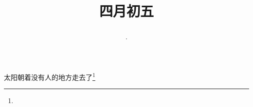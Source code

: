 \title{\date[d=12,m=5,y=2024][year:cn-y,年,month:cn,day:cn,日,·,weekday]·四月初五 }
太阳朝着没有人的地方走去了\footnote{ }

